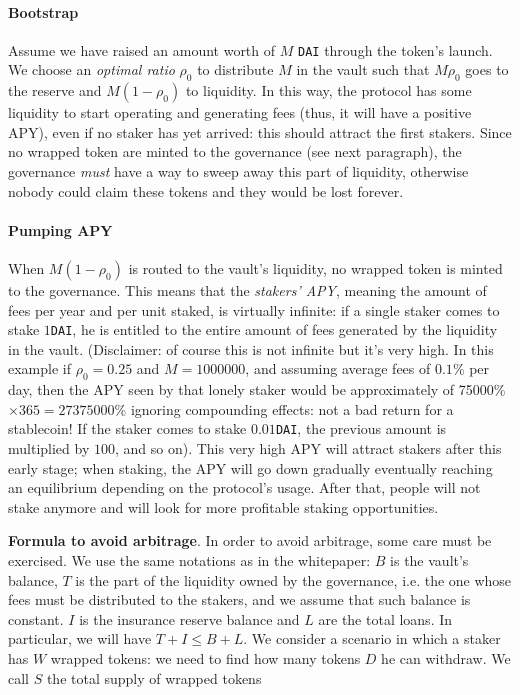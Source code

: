 \documentclass[a4paper,10 pt]{article}
\theoremstyle{definition}
\begin{document}
\paragraph{Bootstrap}\label{bootstrap}

Assume we have raised an amount worth of $M$ \verb|DAI| through the token's launch. We choose an {\it optimal ratio} $\rho_0$ to distribute $M$ in the vault such that $M\rho_0$ goes to the reserve and $M(1-\rho_0)$ to liquidity. In this way, the protocol has some liquidity to start operating and generating fees (thus, it will have a positive APY), even if no staker has yet arrived: this should attract the first stakers. Since no wrapped token are minted to the governance (see next paragraph), the governance {\it must} have a way to sweep away this part of liquidity, otherwise nobody could claim these tokens and they would be lost forever.

\paragraph{Pumping APY}
When $M(1-\rho_0)$ is routed to the vault's liquidity, no wrapped token is minted to the governance. This means that the {\it stakers' APY}, meaning the amount of fees per year and per unit staked, is virtually infinite: if a single staker comes to stake $1$\verb|DAI|, he is entitled to the entire amount of fees generated by the liquidity in the vault. (Disclaimer: of course this is not infinite but it's very high. In this example if $\rho_0 = 0.25$ and $M = 1000000$, and assuming average fees of $0.1$\% per day, then the APY seen by that lonely staker would be approximately of 75000\% $\times 365 = 27375000$\% ignoring compounding effects: not a bad return for a stablecoin! If the staker comes to stake $0.01$\verb|DAI|, the previous amount is multiplied by $100$, and so on).
This very high APY will attract stakers after this early stage; when staking, the APY will go down gradually eventually reaching an equilibrium depending on the protocol's usage. After that, people will not stake anymore and will look for more profitable staking opportunities.

{\bf Formula to avoid arbitrage}. In order to avoid arbitrage, some care must be exercised. We use the same notations as in the whitepaper: $B$ is the vault's balance, $T$ is the part of the liquidity owned by the governance, i.e. the one whose fees must be distributed to the stakers, and we assume that such balance is constant. $I$ is the insurance reserve balance and $L$ are the total loans. In particular, we will have $T + I \le B + L$. We consider a scenario in which a staker has $W$ wrapped tokens: we need to find how many tokens $D$ he can withdraw. We call $S$ the total supply of wrapped tokens
\end{document}
